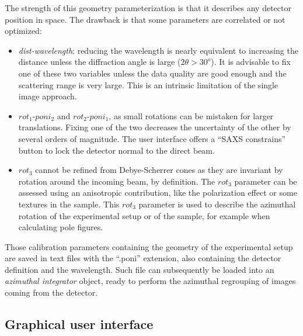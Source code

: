 \documentclass[preprint]{iucr}              %
\begin{document}


The strength of this geometry parameterization is that it describes any detector position in
space. 
The drawback is that some parameters are correlated or not optimized:

\begin{itemize}
  \item \textit{dist-wavelength}: reducing the wavelength is nearly equivalent
  to increasing the distance unless the diffraction angle is 
  large ($2\theta>30^o$). 
  It is advisable to fix one of these two variables unless the data quality are good enough
  and the scattering range is very large. 
  This is an intrinsic limitation of the single image approach.
  \item $rot_1$-$poni_2$ and $rot_2$-$poni_1$, as small rotations can be
  mistaken for larger translations. 
  Fixing one of the two decreases the uncertainty of the other by several orders of
  magnitude. 
  The user interface offers a ``SAXS constrains'' button to lock the detector normal to the direct beam.
  \item $rot_3$ cannot be refined from Debye-Scherrer cones as they are
  invariant by rotation around the incoming beam, by definition. 
  The $rot_3$ parameter can be
  assessed using an anisotropic contribution, like the polarization effect or
  some  textures in the sample.
  This $rot_3$ parameter is used to describe the azimuthal rotation of
  the experimental setup or of the sample, for example when calculating pole
  figures.
\end{itemize}
 
Those calibration parameters containing the geometry of the experimental setup 
are saved in text files with the ``.poni'' extension, 
also containing the detector definition and the wavelength.
Such file can subsequently be loaded into an \textit{azimuthal integrator}
object, ready to perform the azimuthal regrouping of images coming from the detector.

\subsection{Graphical user interface}
\end{document}
